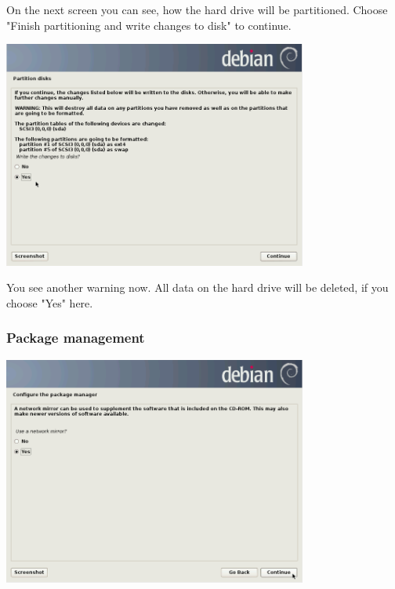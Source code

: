 \documentclass[a4paper,12pt,twoside]{article}
\begin{document}
On the next screen you can see, how the hard drive will be partitioned.
Choose "Finish partitioning and write changes to disk" to continue.

\begin{minipage}{\linewidth}
    \centering
    \includegraphics[width=10cm]{efaLiveen-img/efaLiveen-img13.png}
    \label{fig:conf_write_hdd}
\end{minipage}

You see another warning now. All data on the hard drive will be deleted,
if you choose "Yes" here.


\subsubsection{Package management}
\label{sct:package_management}

\begin{minipage}{\linewidth}
    \centering
    \includegraphics[width=10cm]{efaLiveen-img/efaLiveen-img14.png}
    \label{fig:use_mirror}
\end{minipage}
\end{document}

